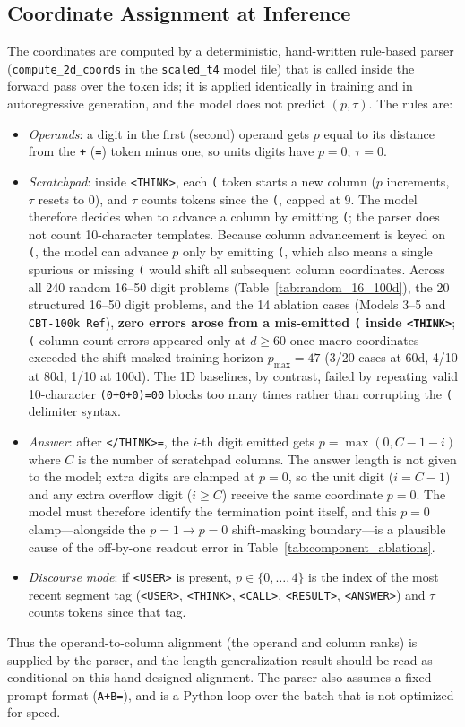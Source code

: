 \documentclass[10pt,twocolumn]{article}
\begin{document}
\subsection{Coordinate Assignment at Inference}
\label{sec:coord_assignment}
The coordinates are computed by a deterministic, hand-written rule-based parser (\texttt{compute\_2d\_coords} in the \texttt{scaled\_t4} model file) that is called inside the forward pass over the token ids; it is applied identically in training and in autoregressive generation, and the model does not predict $(p,\tau)$. The rules are:
\begin{itemize}[leftmargin=*,nosep]
    \item \emph{Operands}: a digit in the first (second) operand gets $p$ equal to its distance from the \texttt{+} (\texttt{=}) token minus one, so units digits have $p=0$; $\tau=0$.
    \item \emph{Scratchpad}: inside \texttt{<THINK>}, each \texttt{(} token starts a new column ($p$ increments, $\tau$ resets to 0), and $\tau$ counts tokens since the \texttt{(}, capped at 9. The model therefore decides when to advance a column by emitting \texttt{(}; the parser does not count 10-character templates. Because column advancement is keyed on \texttt{(}, the model can advance $p$ only by emitting \texttt{(}, which also means a single spurious or missing \texttt{(} would shift all subsequent column coordinates. Across all 240 random 16--50 digit problems (Table~\ref{tab:random_16_100d}), the 20 structured 16--50 digit problems, and the 14 ablation cases (Models 3--5 and \texttt{CBT-100k Ref}), \textbf{zero errors arose from a mis-emitted \texttt{(} inside \texttt{<THINK>}}; \texttt{(} column-count errors appeared only at $d \ge 60$ once macro coordinates exceeded the shift-masked training horizon $p_{\max} = 47$ (3/20 cases at 60d, 4/10 at 80d, 1/10 at 100d). The 1D baselines, by contrast, failed by repeating valid 10-character \texttt{(0+0+0)=00} blocks too many times rather than corrupting the \texttt{(} delimiter syntax.
    \item \emph{Answer}: after \texttt{</THINK>=}, the $i$-th digit emitted gets $p=\max(0, C-1-i)$ where $C$ is the number of scratchpad columns. The answer length is not given to the model; extra digits are clamped at $p=0$, so the unit digit ($i=C-1$) and any extra overflow digit ($i \ge C$) receive the same coordinate $p=0$. The model must therefore identify the termination point itself, and this $p=0$ clamp—alongside the $p=1 \to p=0$ shift-masking boundary—is a plausible cause of the off-by-one readout error in Table~\ref{tab:component_ablations}.
    \item \emph{Discourse mode}: if \texttt{<USER>} is present, $p\in\{0,\dots,4\}$ is the index of the most recent segment tag (\texttt{<USER>}, \texttt{<THINK>}, \texttt{<CALL>}, \texttt{<RESULT>}, \texttt{<ANSWER>}) and $\tau$ counts tokens since that tag.
\end{itemize}
Thus the operand-to-column alignment (the operand and column ranks) is supplied by the parser, and the length-generalization result should be read as conditional on this hand-designed alignment. The parser also assumes a fixed prompt format (\texttt{A+B=}), and is a Python loop over the batch that is not optimized for speed.
\end{document}
